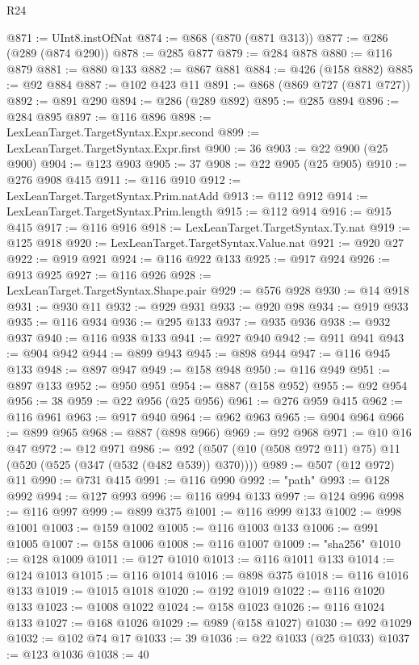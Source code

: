\begin{lexlean}{R24}
\begin{coremodule}
@871 := UInt8.instOfNat
@874 := @868 (@870 (@871 @313))
@877 := @286 (@289 (@874 @290))
@878 := @285 @877
@879 := @284 @878
@880 := @116 @879
@881 := @880 @133
@882 := @867 @881
@884 := @426 (@158 @882)
@885 := @92 @884
@887 := @102 @423 @11
@891 := @868 (@869 @727 (@871 @727))
@892 := @891 @290
@894 := @286 (@289 @892)
@895 := @285 @894
@896 := @284 @895
@897 := @116 @896
@898 := LexLeanTarget.TargetSyntax.Expr.second
@899 := LexLeanTarget.TargetSyntax.Expr.first
@900 := 36
@903 := @22 @900 (@25 @900)
@904 := @123 @903
@905 := 37
@908 := @22 @905 (@25 @905)
@910 := @276 @908 @415
@911 := @116 @910
@912 := LexLeanTarget.TargetSyntax.Prim.natAdd
@913 := @112 @912
@914 := LexLeanTarget.TargetSyntax.Prim.length
@915 := @112 @914
@916 := @915 @415
@917 := @116 @916
@918 := LexLeanTarget.TargetSyntax.Ty.nat
@919 := @125 @918
@920 := LexLeanTarget.TargetSyntax.Value.nat
@921 := @920 @27
@922 := @919 @921
@924 := @116 @922 @133
@925 := @917 @924
@926 := @913 @925
@927 := @116 @926
@928 := LexLeanTarget.TargetSyntax.Shape.pair
@929 := @576 @928
@930 := @14 @918
@931 := @930 @11
@932 := @929 @931
@933 := @920 @98
@934 := @919 @933
@935 := @116 @934
@936 := @295 @133
@937 := @935 @936
@938 := @932 @937
@940 := @116 @938 @133
@941 := @927 @940
@942 := @911 @941
@943 := @904 @942
@944 := @899 @943
@945 := @898 @944
@947 := @116 @945 @133
@948 := @897 @947
@949 := @158 @948
@950 := @116 @949
@951 := @897 @133
@952 := @950 @951
@954 := @887 (@158 @952)
@955 := @92 @954
@956 := 38
@959 := @22 @956 (@25 @956)
@961 := @276 @959 @415
@962 := @116 @961
@963 := @917 @940
@964 := @962 @963
@965 := @904 @964
@966 := @899 @965
@968 := @887 (@898 @966)
@969 := @92 @968
@971 := @10 @16 @47
@972 := @12 @971
@986 := @92 (@507 (@10 (@508 @972 @11) @75) @11 (@520 (@525 (@347 (@532 (@482 @539)) @370))))
@989 := @507 (@12 @972) @11
@990 := @731 @415
@991 := @116 @990
@992 := "path"
@993 := @128 @992
@994 := @127 @993
@996 := @116 @994 @133
@997 := @124 @996
@998 := @116 @997
@999 := @899 @375
@1001 := @116 @999 @133
@1002 := @998 @1001
@1003 := @159 @1002
@1005 := @116 @1003 @133
@1006 := @991 @1005
@1007 := @158 @1006
@1008 := @116 @1007
@1009 := "sha256"
@1010 := @128 @1009
@1011 := @127 @1010
@1013 := @116 @1011 @133
@1014 := @124 @1013
@1015 := @116 @1014
@1016 := @898 @375
@1018 := @116 @1016 @133
@1019 := @1015 @1018
@1020 := @192 @1019
@1022 := @116 @1020 @133
@1023 := @1008 @1022
@1024 := @158 @1023
@1026 := @116 @1024 @133
@1027 := @168 @1026
@1029 := @989 (@158 @1027)
@1030 := @92 @1029
@1032 := @102 @74 @17
@1033 := 39
@1036 := @22 @1033 (@25 @1033)
@1037 := @123 @1036
@1038 := 40

\end{coremodule}
\end{lexlean}

